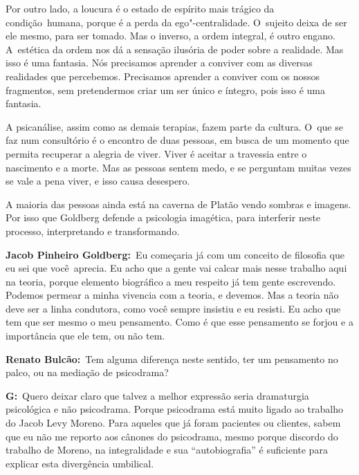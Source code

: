 Por outro lado, a loucura é o estado de espírito mais trágico da
condição\textbf{}~humana, porque é a perda da ego"-centralidade. O~sujeito deixa de ser ele mesmo, para ser tomado. Mas o inverso, a
ordem integral, é outro engano. A~estética da ordem nos dá a sensação
ilusória de poder sobre a realidade. Mas isso é uma fantasia. Nós
precisamos aprender a conviver com as diversas realidades que
percebemos. Precisamos aprender a conviver com os nossos fragmentos, sem
pretendermos criar um ser único e íntegro, pois isso é uma fantasia.

A psicanálise, assim como as demais terapias, fazem parte da cultura. O~que se faz num consultório é o encontro de duas pessoas, em busca de um
momento que permita recuperar a alegria de viver. Viver é aceitar a
travessia entre o nascimento e a morte. Mas as pessoas sentem medo, e se
perguntam muitas vezes se vale a pena viver, e isso causa desespero.

A maioria das pessoas ainda está na caverna de Platão vendo sombras e
imagens. Por isso que Goldberg defende a psicologia imagética, para
interferir neste processo, interpretando e transformando.

\begin{center}\asterisc{}\end{center}

\abrefala

\textbf{Jacob Pinheiro Goldberg:}~Eu começaria já com um conceito de
filosofia que eu sei que você\textbf{}~aprecia. Eu acho que a gente vai
calcar mais nesse trabalho aqui na teoria, porque elemento biográfico a
meu respeito já tem gente escrevendo. Podemos permear a minha vivencia
com a teoria, e devemos. Mas a teoria não deve ser a linha condutora,
como você sempre insistiu e eu resisti. Eu acho que tem que ser mesmo o
meu pensamento. Como é que esse pensamento se forjou e a importância que
ele tem, ou não tem.

 

\textbf{Renato Bulcão:}~Tem alguma diferença neste sentido, ter um
pensamento no palco, ou na mediação de psicodrama?

 

\textbf{G:}~Quero deixar claro que talvez a melhor expressão seria
dramaturgia psicológica e não psicodrama. Porque psicodrama está muito
ligado ao trabalho do Jacob Levy Moreno. Para aqueles que já foram
pacientes ou clientes, sabem que eu não me reporto aos cânones do
psicodrama, mesmo porque discordo do trabalho de Moreno, na
integralidade e sua ``autobiografia'' é suficiente para explicar esta
divergência umbilical.

